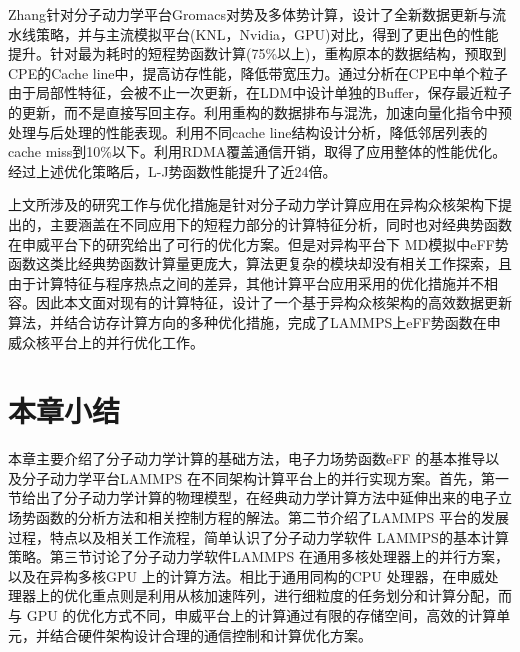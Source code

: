 Zhang\cite{zhang2019sw_gromacs}针对分子动力学平台Gromacs对势及多体势计算，设计了全新数据更新与流水线策略，并与主流模拟平台(KNL，Nvidia，GPU)对比，得到了更出色的性能提升。针对最为耗时的短程势函数计算(75\%以上)，重构原本的数据结构，预取到CPE的Cache line中，提高访存性能，降低带宽压力。通过分析在CPE中单个粒子由于局部性特征，会被不止一次更新，在LDM中设计单独的Buffer，保存最近粒子的更新，而不是直接写回主存。利用重构的数据排布与混洗，加速向量化指令中预处理与后处理的性能表现。利用不同cache line结构设计分析，降低邻居列表的cache miss到10\%以下。利用RDMA\cite{zhu2015congestion}覆盖通信开销，取得了应用整体的性能优化。经过上述优化策略后，L-J势函数性能提升了近24倍。

上文所涉及的研究工作与优化措施是针对分子动力学计算应用在异构众核架构下提出的，主要涵盖在不同应用下的短程力部分的计算特征分析，同时也对经典势函数在申威平台下的研究给出了可行的优化方案。但是对异构平台下 MD模拟中eFF势函数这类比经典势函数计算量更庞大，算法更复杂的模块却没有相关工作探索，且由于计算特征与程序热点之间的差异，其他计算平台应用采用的优化措施并不相容。因此本文面对现有的计算特征，设计了一个基于异构众核架构的高效数据更新算法，并结合访存计算方向的多种优化措施，完成了LAMMPS上eFF势函数在申威众核平台上的并行优化工作。

\section{本章小结}
本章主要介绍了分子动力学计算的基础方法，电子力场势函数eFF 的基本推导以及分子动力学平台LAMMPS 在不同架构计算平台上的并行实现方案。首先，第一节给出了分子动力学计算的物理模型，在经典动力学计算方法中延伸出来的电子立场势函数的分析方法和相关控制方程的解法。第二节介绍了LAMMPS 平台的发展过程，特点以及相关工作流程，简单认识了分子动力学软件 LAMMPS的基本计算策略。第三节讨论了分子动力学软件LAMMPS 在通用多核处理器上的并行方案，以及在异构多核GPU 上的计算方法。相比于通用同构的CPU 处理器，在申威处理器上的优化重点则是利用从核加速阵列，进行细粒度的任务划分和计算分配，而与 GPU 的优化方式不同，申威平台上的计算通过有限的存储空间，高效的计算单元，并结合硬件架构设计合理的通信控制和计算优化方案。

